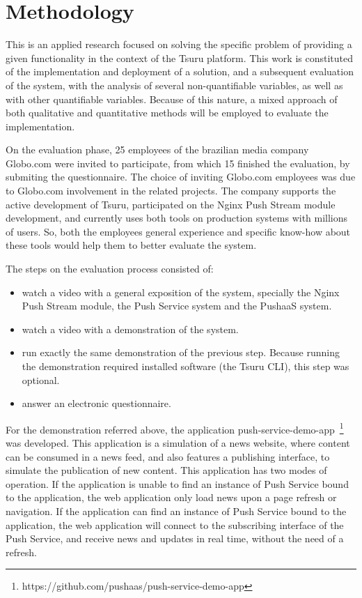 \section{Methodology} \label{section-methodology}

This is an applied research focused on solving the specific problem of providing a given functionality in the context of the Tsuru platform. This work is constituted of the implementation and deployment of a solution, and a subsequent evaluation of the system, with the analysis of several non-quantifiable variables, as well as with other quantifiable variables. Because of this nature, a mixed approach of both qualitative and quantitative methods will be employed to evaluate the implementation.

On the evaluation phase, 25 employees of the brazilian media company Globo.com were invited to participate, from which 15 finished the evaluation, by submiting the questionnaire. The choice of inviting Globo.com employees was due to Globo.com involvement in the related projects. The company supports the active development of Tsuru, participated on the Nginx Push Stream module development, and currently uses both tools on production systems with millions of users. So, both the employees general experience and specific know-how about these tools would help them to better evaluate the system.

The steps on the evaluation process consisted of:

\begin{itemize}
    \item watch a video with a general exposition of the system, specially the Nginx Push Stream module, the Push Service system and the PushaaS system.
    \item watch a video with a demonstration of the system.
    \item run exactly the same demonstration of the previous step. Because running the demonstration required installed software (the Tsuru CLI), this step was optional.
    \item answer an electronic questionnaire.
\end{itemize}

For the demonstration referred above, the application push-service-demo-app~\footnote{https://github.com/pushaas/push-service-demo-app} was developed. This application is a simulation of a news website, where content can be consumed in a news feed, and also features a publishing interface, to simulate the publication of new content. This application has two modes of operation. If the application is unable to find an instance of Push Service bound to the application, the web application only load news upon a page refresh or navigation. If the application can find an instance of Push Service bound to the application, the web application will connect to the subscribing interface of the Push Service, and receive news and updates in real time, without the need of a refresh.

